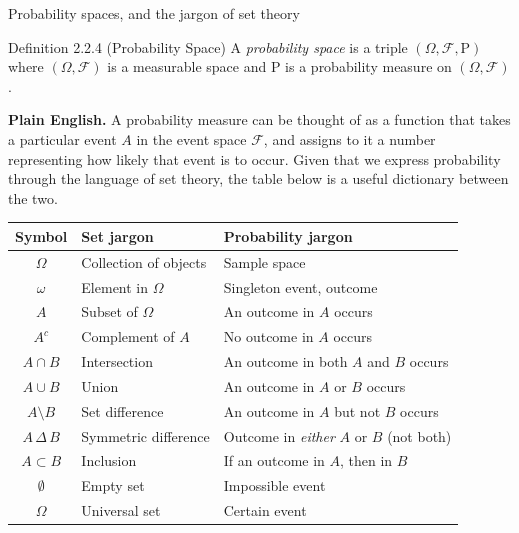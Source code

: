 \documentclass[aspectratio=169,10pt]{beamer}
\begin{document}
\begin{frame}{Probability spaces, and the jargon of set theory}
\begin{block}{Definition 2.2.4 (Probability Space)}
A \emph{probability space} is a triple $(\Omega,\mathcal{F},\mathrm{P})$ where
$(\Omega,\mathcal{F})$ is a measurable space and $\mathrm{P}$ is a probability
measure on $(\Omega,\mathcal{F})$.
\end{block}
\textbf{Plain English.} A probability measure can be thought of as a function
that takes a particular event $A$ in the event space $\mathcal{F}$, and
assigns to it a number representing how likely that event is to occur.
Given that we express probability through the language of set theory, the
table below is a useful dictionary between the two.
\begin{table}
\centering
\scriptsize
\begin{tabular}{|c|l|l|}
\hline
\textbf{Symbol} & \textbf{Set jargon} & \textbf{Probability jargon} \\
\hline
$\Omega$ & Collection of objects & Sample space \\
$\omega$ & Element in $\Omega$ & Singleton event, outcome \\
$A$ & Subset of $\Omega$ & An outcome in $A$ occurs \\
$A^c$ & Complement of $A$ & No outcome in $A$ occurs \\
$A\cap B$ & Intersection & An outcome in both $A$ and $B$ occurs \\
$A\cup B$ & Union & An outcome in $A$ or $B$ occurs \\
$A\setminus B$ & Set difference & An outcome in $A$ but not $B$ occurs \\
$A\,\Delta\, B$ & Symmetric difference & Outcome in \emph{either} $A$ or $B$ (not both) \\
$A\subset B$ & Inclusion & If an outcome in $A$, then in $B$ \\
$\emptyset$ & Empty set & Impossible event \\
$\Omega$ & Universal set & Certain event \\
\hline
\end{tabular}
\end{table}
\end{frame}
\end{document}
